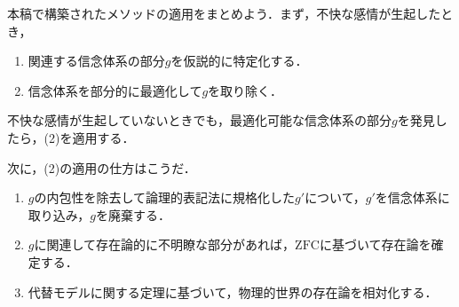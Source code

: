 本稿で構築されたメソッドの適用をまとめよう．まず，不快な感情が生起したとき，
\begin{enumerate}[label=(\arabic*)]
    \item 関連する信念体系の部分$g$を仮説的に特定化する．
    \item 信念体系を部分的に最適化して$g$を取り除く．
\end{enumerate}
不快な感情が生起していないときでも，最適化可能な信念体系の部分$g$を発見したら，(2)を適用する．

次に，(2)の適用の仕方はこうだ．
\begin{enumerate}[label=(\arabic*)]
    \item $g$の内包性を除去して論理的表記法に規格化した$g'$について，$g'$を信念体系に取り込み，$g$を廃棄する．
    \item $g$に関連して存在論的に不明瞭な部分があれば，$\mathrm{ZFC}$に基づいて存在論を確定する．
    \item 代替モデルに関する定理に基づいて，物理的世界の存在論を相対化する．
\end{enumerate}


